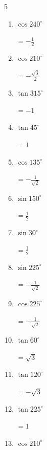 \begin{multicols}{5}
\begin{enumerate}
        $\displaystyle なし$

  \item $\displaystyle \cos{240^\circ}$

        $\displaystyle =-\frac{1}{2}$

  \item $\displaystyle \cos{210^\circ}$

        $\displaystyle =-\frac{\sqrt{3}}{2}$

  \item $\displaystyle \tan{315^\circ}$

        $\displaystyle =-1$

  \item $\displaystyle \tan{45^\circ}$

        $\displaystyle =1$

  \item $\displaystyle \cos{135^\circ}$

        $\displaystyle =-\frac{1}{\sqrt{2}}$

  \item $\displaystyle \sin{150^\circ}$

        $\displaystyle =\frac{1}{2}$

  \item $\displaystyle \sin{30^\circ}$

        $\displaystyle =\frac{1}{2}$

  \item $\displaystyle \sin{225^\circ}$

        $\displaystyle =-\frac{1}{\sqrt{2}}$

\columnbreak %

  \item $\displaystyle \cos{225^\circ}$

        $\displaystyle =-\frac{1}{\sqrt{2}}$

  \item $\displaystyle \tan{60^\circ}$

        $\displaystyle =\sqrt{3}$

  \item $\displaystyle \tan{120^\circ}$

        $\displaystyle =-\sqrt{3}$

  \item $\displaystyle \tan{225^\circ}$

        $\displaystyle =1$

  \item $\displaystyle \cos{210^\circ}$


\end{enumerate}
\end{multicols}
